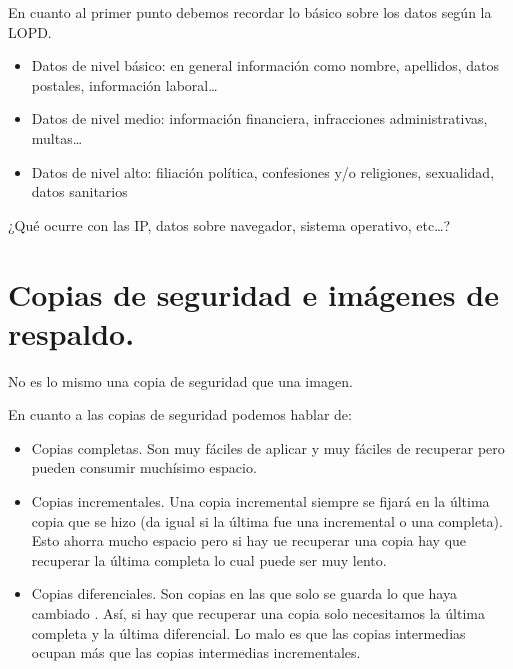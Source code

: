 \documentclass[letterpaper,10pt,spanish]{sphinxmanual}
\begin{document}
En cuanto al primer punto debemos recordar lo básico sobre los datos según la LOPD.
\begin{itemize}
\item {} 
Datos de nivel básico: en general información como nombre, apellidos, datos postales, información laboral…

\item {} 
Datos de nivel medio: información financiera, infracciones administrativas, multas…

\item {} 
Datos de nivel alto: filiación política, confesiones y/o religiones, sexualidad, datos sanitarios

\end{itemize}

¿Qué ocurre con las IP, datos sobre navegador, sistema operativo, etc…?


\section{Copias de seguridad e imágenes de respaldo.}
\label{\detokenize{tema_pautas_seguridad_informatica/tema_pautas_seguridad_informatica:copias-de-seguridad-e-imagenes-de-respaldo}}
No es lo mismo una copia de seguridad que una imagen.

En cuanto a las copias de seguridad podemos hablar de:
\begin{itemize}
\item {} 
Copias completas. Son muy fáciles de aplicar y muy fáciles de recuperar pero pueden consumir muchísimo espacio.

\item {} 
Copias incrementales. Una copia incremental siempre se fijará en la última copia que se hizo (da igual si la última fue una incremental o una completa). Esto ahorra mucho espacio pero si hay ue recuperar una copia hay que recuperar la última completa  lo cual puede ser muy lento.

\item {} 
Copias diferenciales. Son copias en las que solo se guarda lo que haya cambiado  . Así, si hay que recuperar una copia solo necesitamos la última completa y la última diferencial. Lo malo es que las copias intermedias ocupan más que las copias intermedias incrementales.

\end{itemize}
\end{document}
